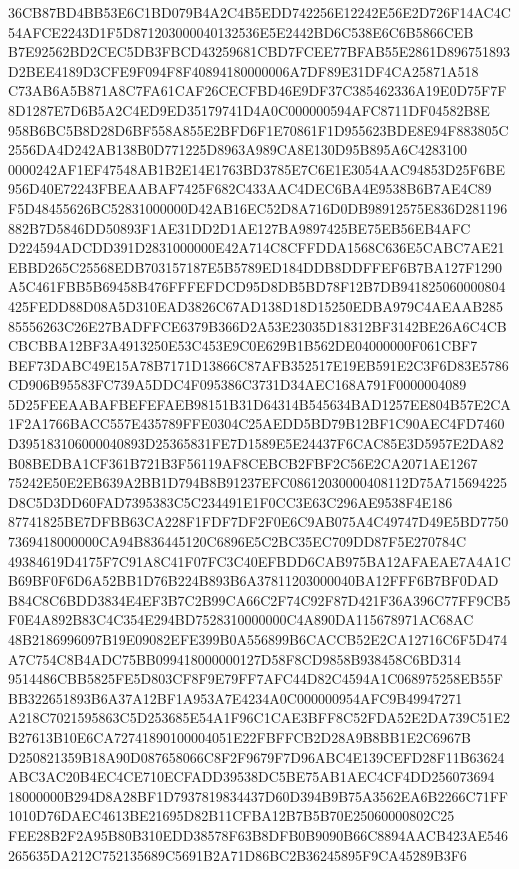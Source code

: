 \documentclass[UTF8,fontset=fandol,zihao=-4,a4paper]{ctexart}
\begin{document}
{{36CB87BD4BB53E6C1BD079B4A2C4B5EDD742256E12242E56E2D726F14AC4C54AFCE2243D1F5D871203000040132536E5E2442BD6C538E6C6B5866CEB
B7E92562BD2CEC5DB3FBCD43259681CBD7FCEE77BFAB55E2861D896751893D2BEE4189D3CFE9F094F8F40894180000006A7DF89E31DF4CA25871A518
C73AB6A5B871A8C7FA61CAF26CECFBD46E9DF37C385462336A19E0D75F7F8D1287E7D6B5A2C4ED9ED35179741D4A0C000000594AFC8711DF04582B8E
958B6BC5B8D28D6BF558A855E2BFD6F1E70861F1D955623BDE8E94F883805C2556DA4D242AB138B0D771225D8963A989CA8E130D95B895A6C4283100
0000242AF1EF47548AB1B2E14E1763BD3785E7C6E1E3054AAC94853D25F6BE956D40E72243FBEAABAF7425F682C433AAC4DEC6BA4E9538B6B7AE4C89
F5D48455626BC52831000000D42AB16EC52D8A716D0DB98912575E836D281196882B7D5846DD50893F1AE31DD2D1AE127BA9897425BE75EB56EB4AFC
D224594ADCDD391D2831000000E42A714C8CFFDDA1568C636E5CABC7AE21EBBD265C25568EDB703157187E5B5789ED184DDB8DDFFEF6B7BA127F1290
A5C461FBB5B69458B476FFFEFDCD95D8DB5BD78F12B7DB941825060000804425FEDD88D08A5D310EAD3826C67AD138D18D15250EDBA979C4AEAAB285
85556263C26E27BADFFCE6379B366D2A53E23035D18312BF3142BE26A6C4CBCBCBBA12BF3A4913250E53C453E9C0E629B1B562DE04000000F061CBF7
BEF73DABC49E15A78B7171D13866C87AFB352517E19EB591E2C3F6D83E5786CD906B95583FC739A5DDC4F095386C3731D34AEC168A791F0000004089
5D25FEEAABAFBEFEFAEB98151B31D64314B545634BAD1257EE804B57E2CA1F2A1766BACC557E435789FFE0304C25AEDD5BD79B12BF1C90AEC4FD7460
D395183106000040893D25365831FE7D1589E5E24437F6CAC85E3D5957E2DA82B08BEDBA1CF361B721B3F56119AF8CEBCB2FBF2C56E2CA2071AE1267
75242E50E2EB639A2BB1D794B8B91237EFC08612030000408112D75A715694225D8C5D3DD60FAD7395383C5C234491E1F0CC3E63C296AE9538F4E186
87741825BE7DFBB63CA228F1FDF7DF2F0E6C9AB075A4C49747D49E5BD77507369418000000CA94B836445120C6896E5C2BC35EC709DD87F5E270784C
49384619D4175F7C91A8C41F07FC3C40EFBDD6CAB975BA12AFAEAE7A4A1CB69BF0F6D6A52BB1D76B224B893B6A37811203000040BA12FFF6B7BF0DAD
B84C8C6BDD3834E4EF3B7C2B99CA66C2F74C92F87D421F36A396C77FF9CB5F0E4A892B83C4C354E294BD7528310000000C4A890DA115678971AC68AC
48B2186996097B19E09082EFE399B0A556899B6CACCB52E2CA12716C6F5D474A7C754C8B4ADC75BB099418000000127D58F8CD9858B938458C6BD314
9514486CBB5825FE5D803CF8F9E79FF7AFC44D82C4594A1C068975258EB55FBB322651893B6A37A12BF1A953A7E4234A0C000000954AFC9B49947271
A218C7021595863C5D253685E54A1F96C1CAE3BFF8C52FDA52E2DA739C51E2B27613B10E6CA72741890100004051E22FBFFCB2D28A9B8BB1E2C6967B
D250821359B18A90D087658066C8F2F9679F7D96ABC4E139CEFD28F11B63624ABC3AC20B4EC4CE710ECFADD39538DC5BE75AB1AEC4CF4DD256073694
18000000B294D8A28BF1D7937819834437D60D394B9B75A3562EA6B2266C71FF1010D76DAEC4613BE21695D82B11CFBA12B7B5B70E25060000802C25
FEE28B2F2A95B80B310EDD38578F63B8DFB0B9090B66C8894AACB423AE546265635DA212C752135689C5691B2A71D86BC2B36245895F9CA45289B3F6
}}
\end{document}
